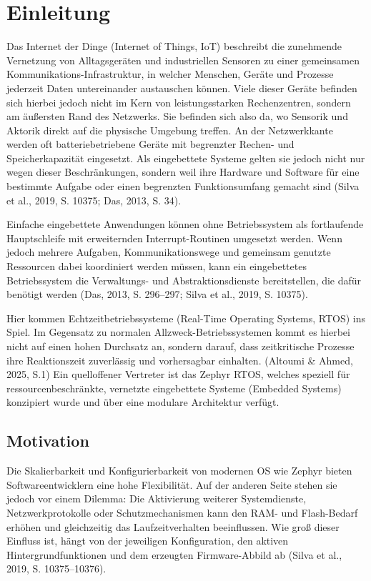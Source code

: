 \chapter{Einleitung}
Das Internet der Dinge (Internet of Things, IoT) beschreibt die zunehmende Vernetzung von Alltagsgeräten und industriellen Sensoren zu einer gemeinsamen Kommunikations-Infrastruktur, in welcher Menschen, Geräte und Prozesse jederzeit Daten untereinander austauschen können. Viele dieser Geräte befinden sich hierbei jedoch nicht im Kern von leistungsstarken Rechenzentren, sondern am äußersten Rand des Netzwerks. Sie befinden sich also da, wo Sensorik und Aktorik direkt auf die physische Umgebung treffen. An der Netzwerkkante werden oft batteriebetriebene Geräte mit begrenzter Rechen- und Speicherkapazität eingesetzt. Als eingebettete Systeme gelten sie jedoch nicht nur wegen dieser Beschränkungen, sondern weil ihre Hardware und Software für eine bestimmte Aufgabe oder einen begrenzten Funktionsumfang gemacht sind (Silva et al., 2019, S. 10375; Das, 2013, S. 34).

Einfache eingebettete Anwendungen können ohne Betriebssystem als fortlaufende Hauptschleife mit erweiternden Interrupt-Routinen umgesetzt werden. Wenn jedoch mehrere Aufgaben, Kommunikationswege und gemeinsam genutzte Ressourcen dabei koordiniert werden müssen, kann ein eingebettetes Betriebssystem die Verwaltungs- und Abstraktionsdienste bereitstellen, die dafür benötigt werden (Das, 2013, S. 296–297; Silva et al., 2019, S. 10375).

Hier kommen Echtzeitbetriebssysteme (Real-Time Operating Systems, RTOS) ins Spiel. Im Gegensatz zu normalen Allzweck-Betriebssystemen kommt es hierbei nicht auf einen hohen Durchsatz an, sondern darauf, dass zeitkritische Prozesse ihre Reaktionszeit zuverlässig und vorhersagbar einhalten. (Altoumi \& Ahmed, 2025, S.1) Ein quelloffener Vertreter ist das Zephyr RTOS, welches speziell für ressourcenbeschränkte, vernetzte eingebettete Systeme (Embedded Systems) konzipiert wurde und über eine modulare Architektur verfügt.


\section{Motivation}
Die Skalierbarkeit und Konfigurierbarkeit von modernen OS wie Zephyr bieten Softwareentwicklern eine hohe Flexibilität. Auf der anderen Seite stehen sie jedoch vor einem Dilemma: Die Aktivierung weiterer Systemdienste, Netzwerkprotokolle oder Schutzmechanismen kann den RAM- und Flash-Bedarf erhöhen und gleichzeitig das Laufzeitverhalten beeinflussen. Wie groß dieser Einfluss ist, hängt von der jeweiligen Konfiguration, den aktiven Hintergrundfunktionen und dem erzeugten Firmware-Abbild ab (Silva et al., 2019, S. 10375–10376).

